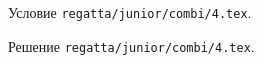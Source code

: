 Условие \texttt{regatta/junior/combi/4.tex}.

\solution Решение \texttt{regatta/junior/combi/4.tex}.
